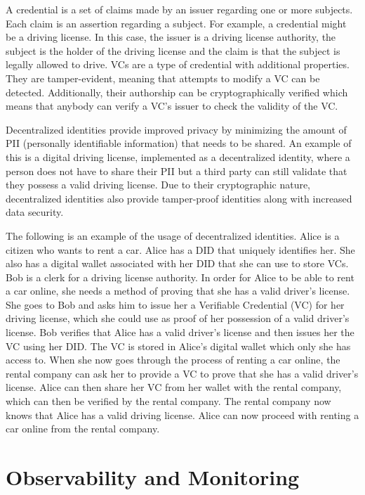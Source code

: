 A credential is a set of claims made by an issuer regarding one or more subjects.
Each claim is an assertion regarding a subject.
For example, a credential might be a driving license. In this case, the issuer is a driving license authority,
the subject is the holder of the driving license and the claim is that the subject is legally allowed to drive.
VCs are a type of credential with additional properties.
They are tamper-evident, meaning that attempts to modify a VC can be detected.
Additionally, their authorship can be cryptographically verified which means that anybody can verify a VC's issuer
to check the validity of the VC.

Decentralized identities provide improved privacy by minimizing the amount of PII (personally identifiable information)
that needs to be shared. An example of this is a digital driving license, implemented as a decentralized identity,
where a person does not have to share their PII but a third party can still validate
that they possess a valid driving license. Due to their cryptographic nature,
decentralized identities also provide tamper-proof identities along with increased data security.

The following is an example of the usage of decentralized identities.
\Gls{Alice} is a citizen who wants to rent a car. \Gls{Alice} has a DID that uniquely identifies her.
She also has a digital wallet associated with her DID that she can use
to store VCs. \Gls{Bob} is a clerk for a driving license authority.
In order for \Gls{Alice} to be able to rent a car online, she needs a method of proving that she has a valid
driver's license. She goes to \Gls{Bob} and asks him to issue her a Verifiable Credential (VC) for her driving
license, which she could use as proof of her possession of a valid driver's license.
\Gls{Bob} verifies that \Gls{Alice} has a valid driver's license and then issues her the VC using her DID.
The VC is stored in Alice's digital wallet which only she has access to.
When she now goes through the process of renting a car online, the rental company
can ask her to provide a VC to prove that she has a valid driver's license.
\Gls{Alice} can then share her VC from her wallet with the rental company, which can then be
verified by the rental company. The rental company now knows that \Gls{Alice} has a valid driving license.
\Gls{Alice} can now proceed with renting a car online from the rental company.

\section{Observability and Monitoring}
\label{sec:foundation_observability}

